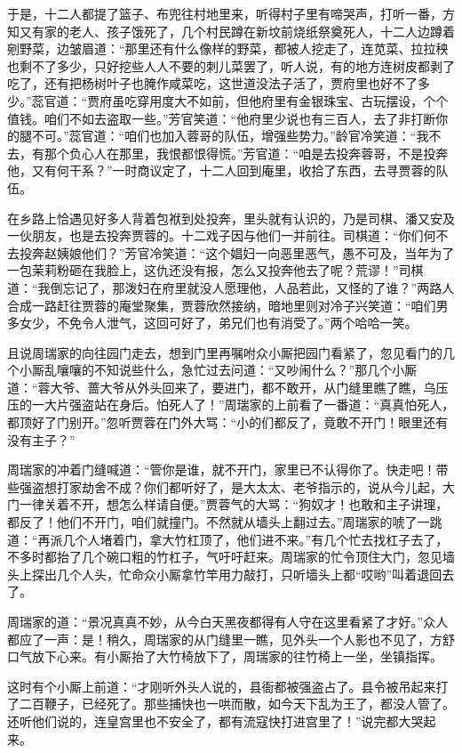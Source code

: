 \documentclass[12pt,oneside]{book}
\begin{document}
于是，十二人都提了篮子、布兜往村地里来，听得村子里有啼哭声，打听一番，方知又有家的老人、孩子饿死了，几个村民蹲在新坟前烧纸祭奠死人，十二人边蹲着剜野菜，边皱眉道：“那里还有什么像样的野菜，都被人挖走了，连苋菜、拉拉秧也剩不了多少，只好挖些人人不要的刺儿菜罢了，听人说，有的地方连树皮都剥了吃了，还有把杨树叶子也腌作咸菜吃，这世道没法子活了，贾府里也好不了多少。”蕊官道：“贾府虽吃穿用度大不如前，但他府里有金银珠宝、古玩摆设，个个值钱。咱们不如去盗取一些。”芳官笑道：“他府里少说也有三百人，去了非打断你的腿不可。”蕊官道：“咱们也加入蓉哥的队伍，增强些势力。”龄官冷笑道：“我不去，有那个负心人在那里，我恨都恨得慌。”芳官道：“咱是去投奔蓉哥，不是投奔他，又有何干系？”一时商议定了，十二人回到庵里，收拾了东西，去寻贾蓉的队伍。

在乡路上恰遇见好多人背着包袱到处投奔，里头就有认识的，乃是司棋、潘又安及一伙朋友，也是去投奔贾蓉的。十二戏子因与他们一并前往。司棋道：“你们何不去投奔赵姨娘他们？”芳官冷笑道：“这个娼妇一向恶里恶气，愚不可及，当年为了一包茉莉粉砸在我脸上，这仇还没有报，怎么又投奔他去了呢？荒谬！”司棋道：“我倒忘记了，那泼妇在府里就没人愿理他，人品若此，又怪的了谁？”两路人合成一路赶往贾蓉的庵堂聚集，贾蓉欣然接纳，暗地里则对冷子兴笑道：“咱们男多女少，不免令人泄气，这回可好了，弟兄们也有消受了。”两个哈哈一笑。

且说周瑞家的向往园门走去，想到门里再嘱咐众小厮把园门看紧了，忽见看门的几个小厮乱嚷嚷的不知说些什么，急忙过去问道：“又吵闹什么？”那几个小厮道：“蓉大爷、蔷大爷从外头回来了，要进门，都不敢开，从门缝里瞧了瞧，乌压压的一大片强盗站在身后。怕死人了！”周瑞家的上前看了一番道：“真真怕死人，都顶好了门别开。”忽听贾蓉在门外大骂：“小的们都反了，竟敢不开门！眼里还有没有主子？”

周瑞家的冲着门缝喊道：“管你是谁，就不开门，家里已不认得你了。快走吧！带些强盗想打家劫舍不成？你们都听好了，是大太太、老爷指示的，说从今儿起，大门一律关着不开，想怎么样请自便。”贾蓉气的大骂：“狗奴才！也敢和主子讲理，都反了！他们不开门，咱们就撞门。不然就从墙头上翻过去。”周瑞家的唬了一跳道：“再派几个人堵着门，拿大竹杠顶了，他们进不来。”有几个忙去找杠子去了，不多时都抬了几个碗口粗的竹杠子，气吁吁赶来。周瑞家的忙令顶住大门，忽见墙头上探出几个人头，忙命众小厮拿竹竿用力敲打，只听墙头上都“哎哟”叫着退回去了。

周瑞家的道：“景况真真不妙，从今白天黑夜都得有人守在这里看紧了才好。”众人都应了一声：是！稍久，周瑞家的从门缝里一瞧，见外头一个人影也不见了，方舒口气放下心来。有小厮抬了大竹椅放下了，周瑞家的往竹椅上一坐，坐镇指挥。

这时有个小厮上前道：“才刚听外头人说的，县衙都被强盗占了。县令被吊起来打了二百鞭子，已经死了。那些捕快也一哄而散，如今天下乱为王了，都没人管了。还听他们说的，连皇宫里也不安全了，都有流寇快打进宫里了！”说完都大哭起来。
\end{document}
